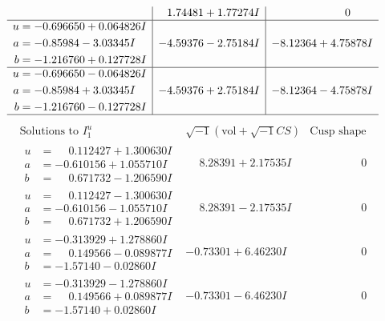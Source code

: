 \documentclass[1p]{elsarticle_modified}
\theoremstyle{definition}
\newcommand{\I}{\sqrt{-1}}
\begin{document}
$$\begin{array}{c|c|c}
 & \phantom{-}1.74481 + 1.77274 I & \phantom{-0.000000 } 0 \\ \hline\begin{aligned}
u &= -0.696650 + 0.064826 I \\
a &= -0.85984 - 3.03345 I \\
b &= -1.216760 + 0.127728 I\end{aligned}
 & -4.59376 - 2.75184 I & -8.12364 + 4.75878 I \\ \hline\begin{aligned}
u &= -0.696650 - 0.064826 I \\
a &= -0.85984 + 3.03345 I \\
b &= -1.216760 - 0.127728 I\end{aligned}
 & -4.59376 + 2.75184 I & -8.12364 - 4.75878 I\\
 \hline 
 \end{array}$$\newpage$$\begin{array}{c|c|c}  
\text{Solutions to }I^u_{1}& \I (\text{vol} + \sqrt{-1}CS) & \text{Cusp shape}\\
 \hline 
\begin{aligned}
u &= \phantom{-}0.112427 + 1.300630 I \\
a &= -0.610156 + 1.055710 I \\
b &= \phantom{-}0.671732 - 1.206590 I\end{aligned}
 & \phantom{-}8.28391 + 2.17535 I & \phantom{-0.000000 } 0 \\ \hline\begin{aligned}
u &= \phantom{-}0.112427 - 1.300630 I \\
a &= -0.610156 - 1.055710 I \\
b &= \phantom{-}0.671732 + 1.206590 I\end{aligned}
 & \phantom{-}8.28391 - 2.17535 I & \phantom{-0.000000 } 0 \\ \hline\begin{aligned}
u &= -0.313929 + 1.278860 I \\
a &= \phantom{-}0.149566 - 0.089877 I \\
b &= -1.57140 - 0.02860 I\end{aligned}
 & -0.73301 + 6.46230 I & \phantom{-0.000000 } 0 \\ \hline\begin{aligned}
u &= -0.313929 - 1.278860 I \\
a &= \phantom{-}0.149566 + 0.089877 I \\
b &= -1.57140 + 0.02860 I\end{aligned}
 & -0.73301 - 6.46230 I & \phantom{-0.000000 } 0 \\ \hline\begin{aligned}

\end{aligned}
\end{array}$$
\end{document}
